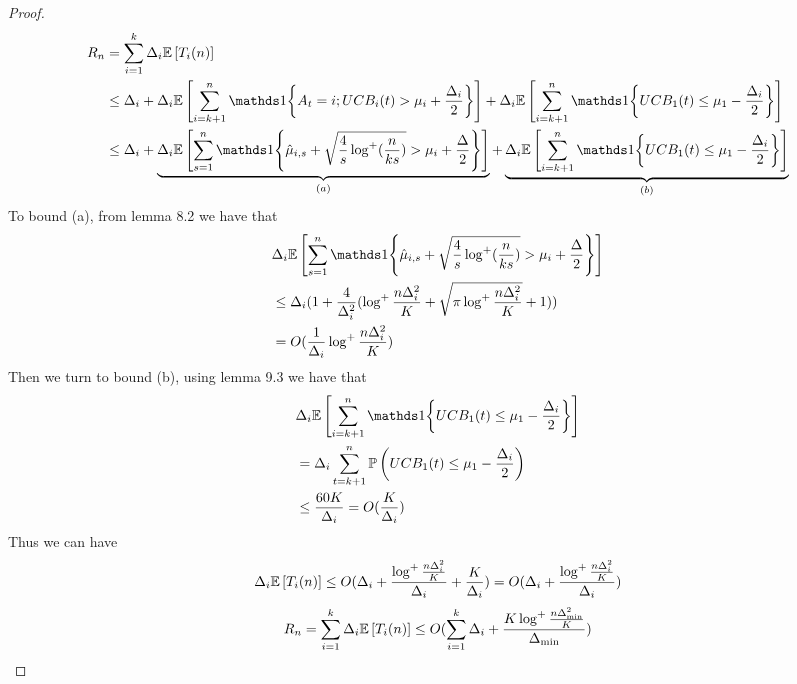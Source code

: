 \begin{proof}
\begin{align*}
    R_n &= \sum_{i=1}^k \Delta_i \EE{T_i(n)} \\
    &\leq \Delta_i + \Delta_i\EE{\sum_{i=k+1}^{n}\bOne{A_t=i; UCB_i(t)>\mu_i + \frac{\Delta_i}{2}}} +  \Delta_i\EE{\sum_{i=k+1}^{n}\bOne{ UCB_1(t)\leq\mu_1 - \frac{\Delta_i}{2}}} \\
    &\leq \Delta_i + \underbrace{\Delta_i\EE{\sum_{s=1}^{n}\bOne{\hat{\mu}_{i,s}+\sqrt{\frac{4}{s}\log^+(\frac{n}{ks})}>\mu_i+\frac{\Delta}{2}}}}_{(a)} +  \underbrace{\Delta_i\EE{\sum_{i=k+1}^{n}\bOne{ UCB_1(t)\leq\mu_1 - \frac{\Delta_i}{2}}}}_{(b)}
\end{align*}
To bound (a), from lemma 8.2 we have that
\begin{align*}
    &\Delta_i\EE{\sum_{s=1}^{n}\bOne{\hat{\mu}_{i,s}+\sqrt{\frac{4}{s}\log^+(\frac{n}{ks})}>\mu_i+\frac{\Delta}{2}}}\\
    &\leq \Delta_i(1+\frac{4}{\Delta_i^2}(\log^+\frac{n\Delta_i^2}{K}+\sqrt{\pi \log^+\frac{n\Delta_i^2}{K}}+1))\\
    &= O(\frac{1}{\Delta_i}\log^+\frac{n\Delta_i^2}{K})
\end{align*}
Then we turn to bound (b), using lemma 9.3 we have that
\begin{align*}
    &\Delta_i\EE{\sum_{i=k+1}^{n}\bOne{ UCB_1(t)\leq\mu_1 - \frac{\Delta_i}{2}}}\\
    &= \Delta_i\sum_{t=k+1}^n \PP{UCB_1(t)\leq \mu_1 - \frac{\Delta_i}{2}}\\
    &\leq \frac{60K}{\Delta_i} = O(\frac{K}{\Delta_i})
\end{align*}
Thus we can have
\begin{align*}
    \Delta_i\mathbb{E} \left[T_i(n)\right] \leq O(\Delta_i + \frac{\log^+\frac{n\Delta_i^2}{K}}{\Delta_i} + \frac{K}{\Delta_i}) = O(\Delta_i + \frac{\log^+\frac{n\Delta_i^2}{K}}{\Delta_i})
\end{align*}
\begin{align*}
    R_n = \sum_{i=1}^{k}\Delta_i\mathbb{E} \left[T_i(n)\right] \leq O(\sum_{i=1}^k\Delta_i+\frac{K\log^+\frac{n\Delta_{\min}^2}{K}}{\Delta_{\min}})
\end{align*}
\end{proof}